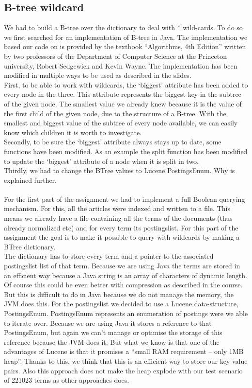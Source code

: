 \documentclass{article}
\begin{document}
\subsection{B-tree wildcard}
We had to build a B-tree over the dictionary to deal with * wild-cards. To do so we first searched for an implementation of B-tree in Java. The implementation we based our code on is provided by the textbook ``Algorithms, 4th Edition'' written by two professors of the Department of Computer Science at the Princeton university,  Robert Sedgewick and Kevin Wayne.
The implementation has been modified in multiple ways to be used as described in the slides.\\
First, to be able to work with wildcards, the `biggest' attribute has been added to every node in the three. This attribute represents the biggest key in the subtree of the given node. The smallest value we already knew because it is the value of the first child of the given node, due to the structure of a B-tree. With the smallest and biggest value of the subtree of every node available, we can easily know which children it is worth to investigate.\\
Secondly, to be sure the `biggest' attribute always stays up to date, some functions have been modified. As an example the split function has been modified to update the `biggest' attribute of a node when it is split in two.\\
Thirdly, we had to change the BTree values to Lucene PostingsEnum. Why is explained further.\\\\
For the first part of the assignment we had to implement a full Boolean querying mechanism. For this, all the articles were indexed and written to a file. This means we already have a file containing all the terms of the documents (thus already normalized etc) and for every term its postingslist. For this part of the assignment the goal is to make it possible to query with wildcards by making a BTree dictionary.\\
The dictionary has to store every term and a pointer to the associated postingslist list of that term. Because we are using Java the terms are stored in an efficient way because a Java string is an array of characters of dynamic length. Of course this could be even better with compression as described in the course. But this is difficult to do in Java because we do not manage the memory, the JVM does this. For the postingslist we decided to use a Lucene data-structure, PostingsEnum. PostingsEnum represents an enumeration of postings were we able to iterate over. Because we are using Java it stores a reference to that PostingsEnum, but again we can't manage or optimise the storage of this reference because the JVM does it. But what we know is that one of the advantages of Lucene is that it promises a ``small RAM requirement -- only 1MB heap''. Thanks to this, we think that this is an efficient way to store our key-value pairs. Also this approach does not make the heap explode with our test scenario of 221023 terms as other approaches does.\\
\end{document}
